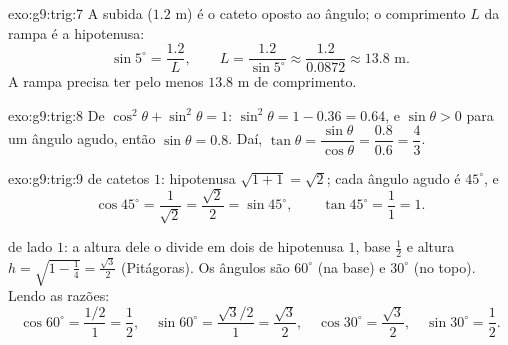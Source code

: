 \begin{solution}{exo:g9:trig:7}
A subida ($1.2$ m) é o cateto oposto ao ângulo; o comprimento $L$ da
rampa é a hipotenusa:
\[
\sin 5^\circ = \frac{1.2}{L},
\qquad
L = \frac{1.2}{\sin 5^\circ} \approx \frac{1.2}{0.0872} \approx 13.8
\text{ m}.
\]
A rampa precisa ter pelo menos $13.8$ m de comprimento.
\end{solution}

\begin{solution}{exo:g9:trig:8}
De $\cos^2\theta + \sin^2\theta = 1$: $\sin^2\theta = 1 - 0.36 = 0.64$,
e $\sin\theta > 0$ para um ângulo agudo, então $\sin\theta = 0.8$.
Daí, $\tan\theta = \dfrac{\sin\theta}{\cos\theta} = \dfrac{0.8}{0.6} =
\dfrac43$.
\end{solution}

\begin{solution}{exo:g9:trig:9}
\emph{ } de catetos $1$: hipotenusa
$\sqrt{1 + 1} = \sqrt2$; cada ângulo agudo é $45^\circ$, e
\[
\cos 45^\circ = \frac{1}{\sqrt2} = \frac{\sqrt2}{2} = \sin 45^\circ,
\qquad
\tan 45^\circ = \frac11 = 1 .
\]

\emph{} de lado $1$: a altura dele o divide em dois
 de hipotenusa $1$, base $\frac12$ e altura
$h = \sqrt{1 - \frac14} = \frac{\sqrt3}{2}$ (Pitágoras). Os ângulos são
$60^\circ$ (na base) e $30^\circ$ (no topo). Lendo as razões:
\[
\cos 60^\circ = \frac{1/2}{1} = \frac12, \quad
\sin 60^\circ = \frac{\sqrt3/2}{1} = \frac{\sqrt3}{2}, \quad
\cos 30^\circ = \frac{\sqrt3}{2}, \quad
\sin 30^\circ = \frac12 .
\]
\end{solution}

